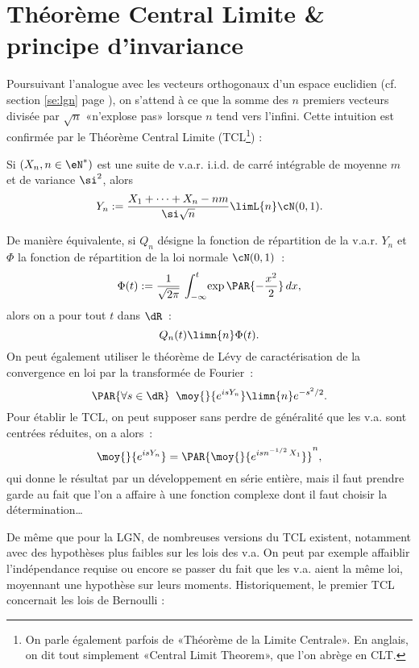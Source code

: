 %
\section{Théorème Central Limite \& principe d'invariance}\label{se:tcl}
%

Poursuivant l'analogue avec les vecteurs orthogonaux d'un espace euclidien
(cf. section \ref{se:lgn} page \pageref{se:lgn}), on s'attend à ce que la
somme des $n$ premiers vecteurs divisée par $\sqrt{n}$ «n'explose pas» lorsque
$n$ tend vers l'infini. Cette intuition est confirmée par le Théorème Central
Limite (TCL\footnote{On parle également parfois de «Théorème de la Limite
  Centrale».  En anglais, on dit tout simplement «Central Limit Theorem», que
  l'on abrège en CLT.}) :
\begin{theorem}
  Si $(X_n,n\in\eN^*)$ est une suite de v.a.r. i.i.d. de carré intégrable de
  moyenne $m$ et de variance $\si^2$, alors
  $$Y_n:=\frac{X_1+\cdots+X_n-nm}{\si\sqrt{n}}\limL{n}\cN(0,1).$$
\end{theorem}
De manière équivalente, si $Q_n$ désigne la fonction de répartition de la
v.a.r. $Y_n$ et $\Phi$ la fonction de répartition de la loi normale $\cN(0,1)$~:
$$
\Phi(t):=\frac{1}{\sqrt{2\pi}}\,\int_{-\infty}^t\!\exp\PAR{-\frac{x^2}{2}}\,dx,
$$
alors on a pour tout $t$ dans $\dR$~:
$$
Q_n(t)\limn{n}\Phi(t).
$$
On peut également utiliser le théorème de Lévy de caractérisation de la
convergence en loi par la transformée de Fourier~:
$$
\PAR{\forall s\in\dR}\;\; \moy{}{e^{isY_n}} \limn{n} e^{-s^2/2}.
$$
Pour établir le TCL, on peut supposer sans perdre de généralité que les
v.a. sont centrées réduites, on a alors~:
$$
\moy{}{e^{isY_n}}=\PAR{\moy{}{e^{isn^{-1/2}\,X_1}}}^n,
$$
qui donne le résultat par un développement en série entière, mais il faut
prendre garde au fait que l'on a affaire à une fonction complexe dont il faut
choisir la détermination\ldots

De même que pour la LGN, de nombreuses versions du TCL existent, notamment
avec des hypothèses plus faibles sur les lois des v.a. On peut par exemple
affaiblir l'indépendance requise ou encore se passer du fait que les v.a.
aient la même loi, moyennant une hypothèse sur leurs moments. Historiquement,
le premier TCL concernait les lois de Bernoulli :

